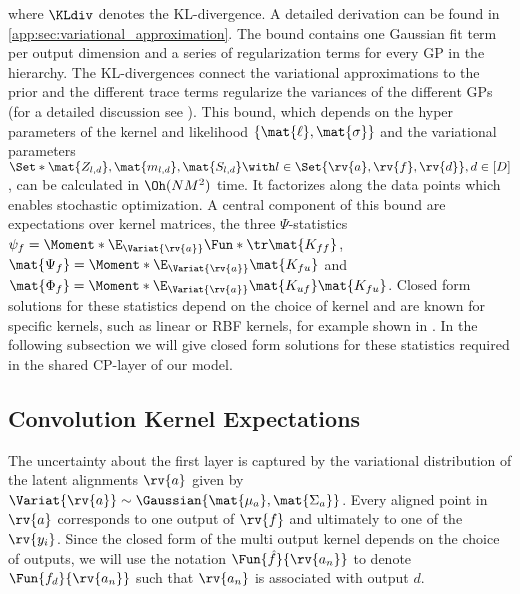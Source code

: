 \documentclass{article}
\begin{document}
where $\KLdiv$ denotes the KL-divergence.
A detailed derivation can be found in \cref{app:sec:variational_approximation}.
The bound contains one Gaussian fit term per output dimension and a series of regularization terms for every GP in the hierarchy.
The KL-divergences connect the variational approximations to the prior and the different trace terms regularize the variances of the different GPs (for a detailed discussion see \parencite{hensman_nested_2014}).
This bound, which depends on the hyper parameters of the kernel and likelihood $\left\{ \mat{\ell}, \mat{\sigma} \right\}$ and the variational parameters $\Set*{\mat{Z_{l,d}}, \mat{m_{l,d}}, \mat{S_{l,d}} \with l \in \Set{\rv{a}, \rv{f}, \rv{d}}, d \in [D]}$, can be calculated in $\Oh(NM^2)$ time.
It factorizes along the data points which enables stochastic optimization.
A central component of this bound are expectations over kernel matrices, the three $\Psi$-statistics $\psi_f = \Moment*{\E_{\Variat{\rv{a}}}}{\Fun*{\tr}{\mat{K_{ff}}}}$, $\mat{\Psi_f} = \Moment*{\E_{\Variat{\rv{a}}}}{\mat{K_{fu}}}$ and $\mat{\Phi_f} = \Moment*{\E_{\Variat{\rv{a}}}}{\mat{K_{uf}}\mat{K_{fu}}}$.
Closed form solutions for these statistics depend on the choice of kernel and are known for specific kernels, such as linear or RBF kernels, for example shown in \cite{damianou_deep_2012}.
In the following subsection we will give closed form solutions for these statistics required in the shared CP-layer of our model.

\subsection{Convolution Kernel Expectations}
\label{subsec:kernel_expectations}
The uncertainty about the first layer is captured by the variational distribution of the latent alignments $\rv{a}$ given by $\Variat{\rv{a}} \sim \Gaussian{\mat{\mu_a}, \mat{\Sigma_a}}$.
Every aligned point in $\rv{a}$ corresponds to one output of $\rv{f}$ and ultimately to one of the $\rv{y_i}$.
Since the closed form of the multi output kernel depends on the choice of outputs, we will use the notation $\Fun{\hat{f}}{\rv{a_n}}$ to denote $\Fun{f_d}{\rv{a_n}}$ such that $\rv{a_n}$ is associated with output $d$.
\end{document}
